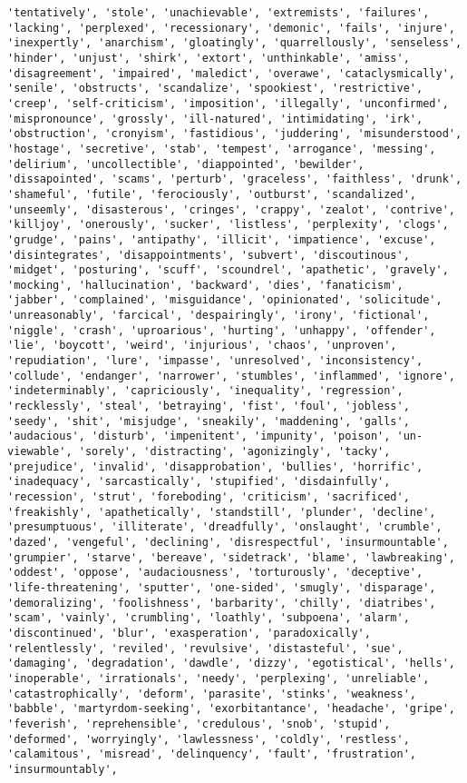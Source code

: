 \documentclass[11pt]{article}
\begin{document}
\begin{Verbatim}[commandchars=\\\{\}]
'tentatively', 'stole', 'unachievable', 'extremists', 'failures', 'lacking', 'perplexed', 'recessionary', 'demonic', 'fails', 'injure', 'inexpertly', 'anarchism', 'gloatingly', 'quarrellously', 'senseless', 'hinder', 'unjust', 'shirk', 'extort', 'unthinkable', 'amiss', 'disagreement', 'impaired', 'maledict', 'overawe', 'cataclysmically', 'senile', 'obstructs', 'scandalize', 'spookiest', 'restrictive', 'creep', 'self-criticism', 'imposition', 'illegally', 'unconfirmed', 'mispronounce', 'grossly', 'ill-natured', 'intimidating', 'irk', 'obstruction', 'cronyism', 'fastidious', 'juddering', 'misunderstood', 'hostage', 'secretive', 'stab', 'tempest', 'arrogance', 'messing', 'delirium', 'uncollectible', 'diappointed', 'bewilder', 'dissapointed', 'scams', 'perturb', 'graceless', 'faithless', 'drunk', 'shameful', 'futile', 'ferociously', 'outburst', 'scandalized', 'unseemly', 'disasterous', 'cringes', 'crappy', 'zealot', 'contrive', 'killjoy', 'onerously', 'sucker', 'listless', 'perplexity', 'clogs', 'grudge', 'pains', 'antipathy', 'illicit', 'impatience', 'excuse', 'disintegrates', 'disappointments', 'subvert', 'discoutinous', 'midget', 'posturing', 'scuff', 'scoundrel', 'apathetic', 'gravely', 'mocking', 'hallucination', 'backward', 'dies', 'fanaticism', 'jabber', 'complained', 'misguidance', 'opinionated', 'solicitude', 'unreasonably', 'farcical', 'despairingly', 'irony', 'fictional', 'niggle', 'crash', 'uproarious', 'hurting', 'unhappy', 'offender', 'lie', 'boycott', 'weird', 'injurious', 'chaos', 'unproven', 'repudiation', 'lure', 'impasse', 'unresolved', 'inconsistency', 'collude', 'endanger', 'narrower', 'stumbles', 'inflammed', 'ignore', 'indeterminably', 'capriciously', 'inequality', 'regression', 'recklessly', 'steal', 'betraying', 'fist', 'foul', 'jobless', 'seedy', 'shit', 'misjudge', 'sneakily', 'maddening', 'galls', 'audacious', 'disturb', 'impenitent', 'impunity', 'poison', 'un-viewable', 'sorely', 'distracting', 'agonizingly', 'tacky', 'prejudice', 'invalid', 'disapprobation', 'bullies', 'horrific', 'inadequacy', 'sarcastically', 'stupified', 'disdainfully', 'recession', 'strut', 'foreboding', 'criticism', 'sacrificed', 'freakishly', 'apathetically', 'standstill', 'plunder', 'decline', 'presumptuous', 'illiterate', 'dreadfully', 'onslaught', 'crumble', 'dazed', 'vengeful', 'declining', 'disrespectful', 'insurmountable', 'grumpier', 'starve', 'bereave', 'sidetrack', 'blame', 'lawbreaking', 'oddest', 'oppose', 'audaciousness', 'torturously', 'deceptive', 'life-threatening', 'sputter', 'one-sided', 'smugly', 'disparage', 'demoralizing', 'foolishness', 'barbarity', 'chilly', 'diatribes', 'scam', 'vainly', 'crumbling', 'loathly', 'subpoena', 'alarm', 'discontinued', 'blur', 'exasperation', 'paradoxically', 'relentlessly', 'reviled', 'revulsive', 'distasteful', 'sue', 'damaging', 'degradation', 'dawdle', 'dizzy', 'egotistical', 'hells', 'inoperable', 'irrationals', 'needy', 'perplexing', 'unreliable', 'catastrophically', 'deform', 'parasite', 'stinks', 'weakness', 'babble', 'martyrdom-seeking', 'exorbitantance', 'headache', 'gripe', 'feverish', 'reprehensible', 'credulous', 'snob', 'stupid', 'deformed', 'worryingly', 'lawlessness', 'coldly', 'restless', 'calamitous', 'misread', 'delinquency', 'fault', 'frustration', 'insurmountably', 
\end{Verbatim}
\end{document}

